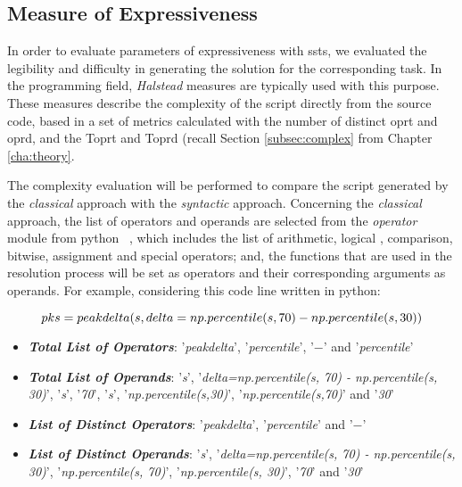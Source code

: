 \subsection{Measure of Expressiveness}

In order to evaluate parameters of expressiveness with \gls{ssts}, we evaluated the legibility and difficulty in generating the solution for the corresponding task. In the programming field, \textit{Halstead} measures are typically used with this purpose. These measures describe the complexity of the script directly from the source code, based in a set of metrics calculated with the number of distinct \gls{oprt} and \gls{oprd}, and the \gls{Toprt} and \gls{Toprd} (recall Section \ref{subsec:complex} from Chapter \ref{cha:theory}.
\par
The complexity evaluation will be performed to compare the script generated by the \textit{classical} approach with the \textit{syntactic} approach. Concerning the \textit{classical} approach, the list of operators and operands are selected from the \textit{operator} module from python ~\citep{oprtPy}, which includes the list of arithmetic, logical , comparison, bitwise, assignment and special operators; and, the functions that are used in the resolution process will be set as operators and their corresponding arguments as operands. For example, considering this code line written in python:

\begin{equation}
\centering
pks = peakdelta(s, delta=np.percentile(s, 70) - np.percentile(s, 30))
\end{equation}


\begin{itemize}
\item \textit{\textbf{Total List of Operators}}: '\textit{peakdelta}', '\textit{percentile}', '$-$' and '\textit{percentile}'
\item \textit{\textbf{Total List of Operands}}: '\textit{s}', '\textit{delta=np.percentile(s, 70) - np.percentile(s, 30)}', '\textit{s}', '\textit{70}', '\textit{s}', '\textit{np.percentile(s,30)}', '\textit{np.percentile(s,70)}' and '\textit{30}'
\item \textit{\textbf{List of Distinct Operators}}: '\textit{peakdelta}', '\textit{percentile}' and '$-$'
\item \textit{\textbf{List of Distinct Operands}}: '\textit{s}', '\textit{delta=np.percentile(s, 70) - np.percentile(s, 30)}', '\textit{np.percentile(s, 70)}', '\textit{np.percentile(s, 30)}',  '\textit{70}' and '\textit{30}'
\end{itemize}

